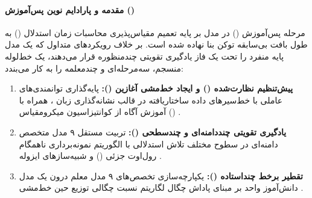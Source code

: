 \item {}

\paragraph*{مقدمه و پارادایم نوین پس‌آموزش ()}
مرحله پس‌آموزش () در مدل  \cite{kimi2026k3} بر پایه تعمیم مقیاس‌پذیری محاسبات زمان استدلال () \cite{openai2024o1, anthropic2025extended, guo2025deepseekr1, kimi2025k15} به طول بافت بی‌سابقه  توکن بنا نهاده شده است. بر خلاف رویکردهای متداول که یک مدل پایه منفرد را تحت یک فاز یادگیری تقویتی چندمنظوره قرار می‌دهند،  یک خط‌لوله منسجم، سه‌مرحله‌ای و چندمعلمه را به کار می‌بندد:
\begin{enumerate}
    \item \textbf{پیش‌تنظیم نظارت‌شده () و ایجاد خط‌مشی آغازین ():} پایه‌گذاری توانمندی‌های عاملی با خط‌سیرهای داده ساختاریافته در قالب نشانه‌گذاری زبان ، همراه با آموزش آگاه از کوانتیزاسیون میکرومقیاس () \cite{rouhani2023microscaling, jacob2018quantization}.
    \item \textbf{یادگیری تقویتی چنددامنه‌ای و چندسطحی ():} تربیت مستقل ۹ مدل متخصص دامنه‌ای در سطوح مختلف تلاش استدلالی با الگوریتم نمونه‌برداری ناهمگام رول‌اوت جزئی () \cite{kimi2025k15, kimi2026k25} و شبیه‌سازهای ایزوله  \cite{agache2020firecracker}.
    \item \textbf{تقطیر برخط چنداستاده ():} یکپارچه‌سازی تخصص‌های ۹ مدل معلم درون یک مدل دانش‌آموز واحد بر مبنای پاداش چگال لگاریتم نسبت چگالی توزیع حین خط‌مشی \cite{lu2025onpolicy, xiao2026mimo, deepseek2026v4}.
\end{enumerate}

